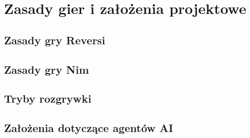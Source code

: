 \chapter{Zasady gier i założenia projektowe}

\section{Zasady gry Reversi}

\section{Zasady gry Nim}

\section{Tryby rozgrywki}

\section{Założenia dotyczące agentów AI}
